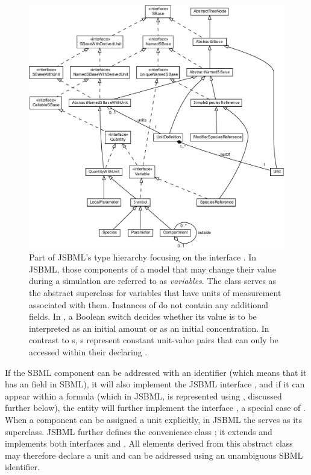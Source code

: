 \begin{figure}[b]
  \vspace*{2ex}
  \centering
  \includegraphics[width=\textwidth]{../common/img/Symbol.pdf}
  \caption[The interface \Variable]{Part of JSBML's type hierarchy focusing
    on the interface \Variable.  In JSBML, those components of a model that
    may change their value during a simulation are referred to as
    \emph{variables}. The class \Symbol serves as the abstract superclass for
    variables that have units of measurement associated with them. Instances
    of \Parameter do not contain any additional fields. In \Species, a
    Boolean switch decides whether its value is to be interpreted as an
    initial amount or as an initial concentration. In contrast to
    \Variable{}s, \LocalParameter{}s represent constant unit-value pairs that
    can only be accessed within their declaring
    \KineticLaw. }
 \label{fig:Variable}
\end{figure}


If the SBML component can be addressed with an identifier (which means that
it has an  field in SBML), it will also implement the JSBML
interface \NamedSBaseWithDerivedUnit, and if it can appear within a formula
(which in JSBML, is represented using \ASTNode, discussed further below),
the entity will further implement the interface \CallableSBase, a special
case of .  When a component can be assigned
a unit explicitly, in JSBML the \SBaseWithUnit serves as its superclass.
JSBML further defines the convenience class \AbstractNamedSBaseWithUnit; it
extends \AbstractNamedSBase and implements both interfaces \SBaseWithUnit
and \NamedSBaseWithDerivedUnit.  All elements derived from this abstract
class may therefore declare a unit and can be addressed using an
unambiguous SBML identifier.

